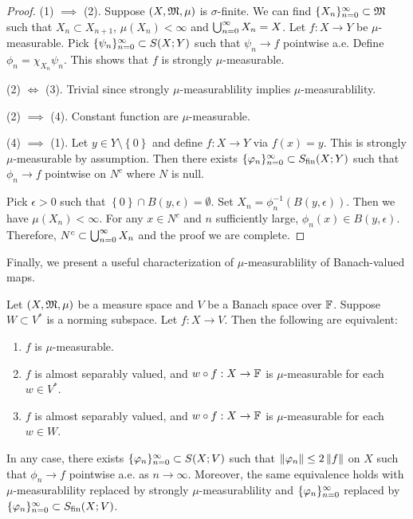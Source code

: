 \documentclass[a4paper]{article}
\begin{document}
\begin{proof}
  (1) $\implies$ (2). Suppose $(X, \mathfrak{M}, \mu)$ is
  $\sigma$-finite. We can find $\{ X_n \}_{n=0}^\infty
  \subset \mathfrak{M}$ such that $X_n \subset X_{n+1}$,
  $\mu(X_n) < \infty$ and $\bigcup_{n=0}^\infty X_n = X$.
  Let $f: X \to Y$ be $\mu$-measurable. Pick
  $\{ \psi_n \}_{n=0}^\infty \subset S(X; Y)$ such that
  $\psi_n \to f$ pointwise a.e. Define
  $\phi_n = \chi_{X_n} \psi_n$. This shows that
  $f$ is strongly $\mu$-measurable.

  (2) $\iff$ (3). Trivial since strongly $\mu$-measurablility
  implies $\mu$-measurablility.

  (2) $\implies$ (4). Constant function are $\mu$-measurable.

  (4) $\implies$ (1). Let $y \in Y \setminus \left\{ 0 \right\}$
  and define $f : X \to Y$ via $f(x) = y$. This
  is strongly $\mu$-measurable by assumption.
  Then there exists $\{ \varphi_n \}_{n=0}^\infty \subset S_{\text{fin}}(X; Y)$
  such that $\phi_n \to f$ pointwise on $N^c$ where
  $N$ is null.

  Pick $\epsilon > 0$ such that $\left\{ 0 \right\}
  \cap B(y, \epsilon) = \emptyset$. Set
  $X_n = \phi_n^{-1} (B(y, \epsilon))$. Then we have
  $\mu(X_n) < \infty$. For any $x \in N^c$ and $n$
  sufficiently large, $\phi_n(x) \in B(y, \epsilon)$.
  Therefore, $N^c \subset \bigcup_{n=0}^\infty X_n$ and
  the proof we are complete.

\end{proof}

Finally, we present a useful characterization of
$\mu$-measurablility of Banach-valued maps.

\begin{thm}[Pettis]
  Let $(X, \mathfrak{M}, \mu)$ be a measure space and $V$ be a
  Banach space over $\mathbb{F}$. Suppose $W \subset V^*$ is a
  norming subspace. Let $f: X \to V$. Then the following
  are equivalent:
  \begin{enumerate}
    \item $f$ is $\mu$-measurable.
    \item $f$ is almost separably valued, and $w \circ
    f : X \to \mathbb{F}$ is $\mu$-measurable for each $w \in V^*$.
    \item $f$ is almost separably valued, and $w \circ f:
    X \to \mathbb{F}$ is $\mu$-measurable for each $w \in W$.
  \end{enumerate}
  In any case, there exists $\{ \varphi_n \}_{n=0}^\infty \subset S(X; V)
  $ such that $\left\lVert \varphi_n\right\rVert \leq 2 \left\lVert f\right\rVert$ on $X$ such that
  $\phi_n \to f$ pointwise a.e. as $n \to \infty$.
  Moreover, the same
  equivalence holds with $\mu$-measurablility replaced by
  strongly $\mu$-measurablility and $\{ \varphi_n \}_{n=0}^\infty$
  replaced by $\{ \varphi_n \}_{n=0}^\infty \subset S_{\text{fin}}(X; V)$.
\end{thm}
\end{document}
